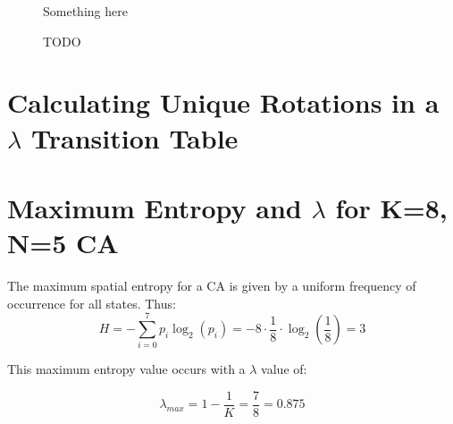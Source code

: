 \documentclass[a4paper,11pt]{report}
\begin{document}
\begin{appendices}
\begin{figure}
\begin{tabular}{cccc}

\end{tabular}
\caption[Rhomb Single Run Sequence]{
    Something here
}
\label{fig:crh_666_seq}

\end{figure}


\begin{figure}
\centering
\caption[Canonical Grid Data File]{
	TODO
}
\label{fig:gridfile}
\end{figure}

\section{Calculating Unique Rotations in a $\lambda$ Transition Table}
\label{appB:rot}

\section{Maximum Entropy and $\lambda$ for K=8, N=5 CA}
\label{appB:max_H}
The maximum spatial entropy for a CA is given by a uniform frequency of occurrence for all states. Thus:
\begin{equation}
H = - \sum^{7}_{i=0} p_i \log_2(p_i) = - 8 \cdot \frac{1}{8} \cdot \log_2(\frac{1}{8}) = 3
\end{equation}

This maximum entropy value occurs with a $\lambda$ value of:

\begin{equation}
\lambda_{max} = 1 - \frac{1}{K} = \frac{7}{8} = 0.875 
\end{equation}

\processdelayedfloats
\end{appendices}



\end{document}

